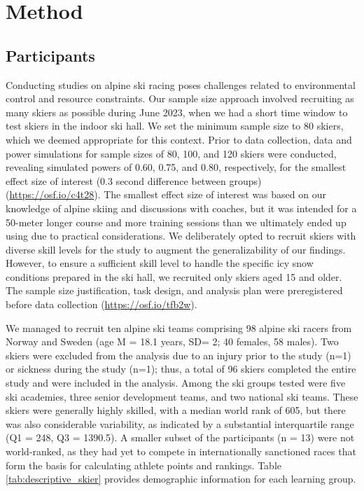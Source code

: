 \documentclass[pdflatex,sn-nature]{sn-jnl}%
\theoremstyle{thmstyleone}%
\theoremstyle{thmstyletwo}%
\theoremstyle{thmstylethree}%
\begin{document}
\section{Method}


\subsection{Participants}
Conducting studies on alpine ski racing poses challenges related to environmental control and resource constraints. Our sample size approach involved recruiting as many skiers as possible during June 2023, when we had a short time window to test skiers in the indoor ski hall. We set the minimum sample size to 80 skiers, which we deemed appropriate for this context. Prior to data collection, data and power simulations for sample sizes of 80, 100, and 120 skiers were conducted, revealing simulated powers of 0.60, 0.75, and 0.80, respectively, for the smallest effect size of interest (0.3 second difference between groups) (\url{https://osf.io/c4t28}). The smallest effect size of interest was based on our knowledge of alpine skiing and discussions with coaches, but it was intended for a 50-meter longer course and more training sessions than we ultimately ended up using due to practical considerations. We deliberately opted to recruit skiers with diverse skill levels for the study to augment the generalizability of our findings. However, to ensure a sufficient skill level to handle the specific icy snow conditions prepared in the ski hall, we recruited only skiers aged 15 and older. The sample size justification, task design, and analysis plan were preregistered before data collection (\url{https://osf.io/tfb2w}).

We managed to recruit ten alpine ski teams comprising 98 alpine ski racers from Norway and Sweden (age M = 18.1 years, SD= 2; 40 females, 58 males). Two skiers were excluded from the analysis due to an injury prior to the study (n=1) or sickness during the study (n=1); thus, a total of 96 skiers completed the entire study and were included in the analysis.  Among the ski groups tested were five ski academies, three senior development teams, and two national ski teams. These skiers were generally highly skilled, with a median world rank of 605, but there was also considerable variability, as indicated by a substantial interquartile range (Q1 = 248, Q3 = 1390.5). A smaller subset of the participants (n = 13) were not world-ranked, as they had yet to compete in internationally sanctioned races that form the basis for calculating athlete points and rankings. Table \ref{tab:descriptive_skier} provides demographic information for each learning group.
\end{document}
